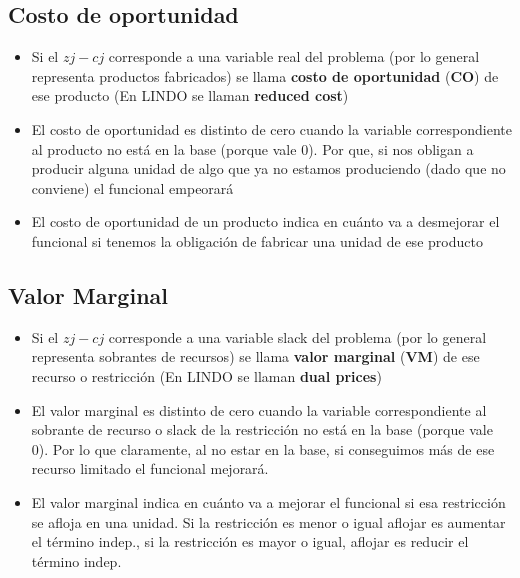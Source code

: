 \documentclass[titlepage,a4paper]{article}
\begin{document}
\subsection{Costo de oportunidad}

\begin{itemize}
    \item Si el $zj - cj$ corresponde a una variable real del problema (por lo general representa productos fabricados) se llama \textbf{costo de oportunidad} (\textbf{CO}) de ese producto  (En LINDO se llaman \textbf{reduced cost})
    \item El costo de oportunidad es distinto de cero cuando la variable correspondiente al producto no está en la base (porque vale 0). Por que, si nos obligan a producir alguna unidad de algo que ya no estamos produciendo (dado que no conviene) el funcional empeorará
    \item El costo de oportunidad de un producto indica en cuánto va a desmejorar el funcional si tenemos la obligación de fabricar una unidad de ese producto
\end{itemize}

\vspace{0.5cm}

\subsection{Valor Marginal}


\begin{itemize}
    \item Si el $zj - cj$ corresponde a una variable slack del problema (por lo general representa sobrantes de recursos) se llama \textbf{valor marginal} (\textbf{VM}) de ese recurso o restricción (En LINDO se llaman \textbf{dual prices})
    \item El valor marginal es distinto de cero cuando la variable correspondiente al sobrante de recurso o slack de la restricción no está en la base (porque vale 0). Por lo que claramente, al no estar en la base, si conseguimos más de ese recurso limitado el funcional mejorará.
    \item El valor marginal indica en cuánto va a mejorar el funcional si esa restricción se afloja en una unidad. Si la restricción es menor o igual aflojar es aumentar el término indep., si la restricción es mayor o igual, aflojar es reducir el término indep.
\end{itemize}

\vspace{1cm}
\end{document}
